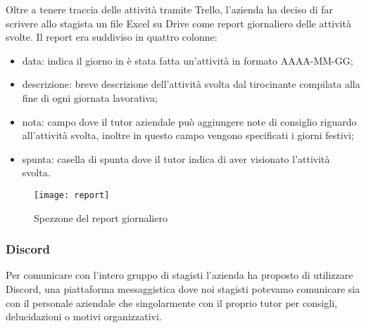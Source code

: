 Oltre a tenere traccia delle attività tramite Trello, l'azienda ha deciso di far scrivere allo stagista un file Excel su Drive come report giornaliero delle attività svolte. Il report era suddiviso in quattro colonne:
\begin{itemize}
	\item data: indica il giorno in è stata fatta un'attività in formato AAAA-MM-GG;
	\item descrizione: breve descrizione dell'attività svolta dal tirocinante compilata alla fine di ogni giornata lavorativa;
	\item nota: campo dove il tutor aziendale può aggiungere note di consiglio riguardo all'attività svolta, inoltre in questo campo vengono specificati i giorni festivi;
	\item spunta: casella di spunta dove il tutor indica di aver visionato l'attività svolta.
\end{itemize}

\begin{figure}[h]
	\begin{center}
		\texttt{[image: report]}
		\caption{Spezzone del report giornaliero}
	\end{center}
\end{figure}


\subsubsection{Discord}

Per comunicare con l'intero gruppo di stagisti l'azienda ha proposto di utilizzare Discord, una piattaforma messaggistica dove noi stagisti potevamo comunicare sia con il personale aziendale che singolarmente con il proprio tutor per consigli, delucidazioni o motivi organizzativi.